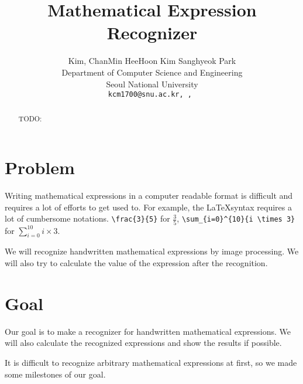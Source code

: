 \documentclass[10pt,twocolumn,letterpaper]{article}
\begin{document}
\title{Mathematical Expression Recognizer}

\author{Kim, ChanMin \qquad HeeHoon Kim \qquad Sanghyeok Park\\
Department of Computer Science and Engineering\\
Seoul National University\\
{\tt\small kcm1700@snu.ac.kr, , }
}

\maketitle

\begin{abstract}
TODO:
\end{abstract}

\section{Problem}

Writing mathematical expressions in a computer readable format is difficult and requires a lot of efforts to get used to.
For example, the \LaTeX syntax requires a lot of cumbersome notations. \verb'\frac{3}{5}' for $\frac{3}{5}$, \verb'\sum_{i=0}^{10}{i \times 3}' for $\sum_{i=0}^{10}{i \times 3}$.

We will recognize handwritten mathematical expressions by image processing.
We will also try to calculate the value of the expression after the recognition.



\section{Goal}

Our goal is to make a recognizer for handwritten mathematical expressions. We will also calculate the recognized expressions and show the results if possible.

It is difficult to recognize arbitrary mathematical expressions at first, so we made some milestones of our goal.
\end{document}

